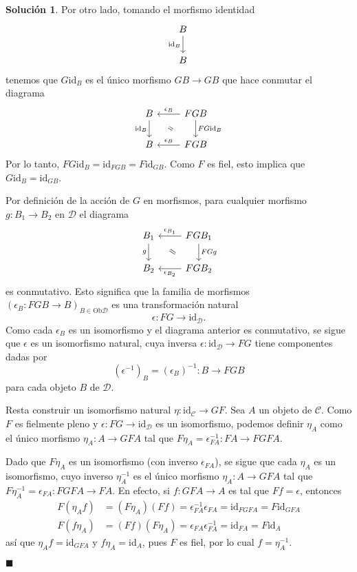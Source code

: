 \documentclass[12pt,letterpaper,titlepage]{article}
\newcommand{\xqed}[1]{%
  \leavevmode\unskip\penalty9999 \hbox{}\nobreak\hfill
  \quad\hbox{\ensuremath{#1}}}
\theoremstyle{definition}
\newtheorem*{soltemp}{Solución}
\newenvironment{sol}[1]{%
    \begin{soltemp}#1}{%
    \xqed{\blacksquare}\end{soltemp}%
}
\renewcommand\cal[1]{\mathcal{#1}}
\newcommand\com[2]{\ar[equal,from={#1},to={#2},shorten=5mm]}
\newcommand\<{\langle}
\renewcommand\>{\rangle}
\newcommand{\Ob}{\mathrm{Ob}}
\newcommand{\id}{\mathrm{id}}
\begin{document}
\begin{sol}
    Por otro lado, tomando el morfismo identidad
    \[
        \begin{tikzcd}
            B \ar[d,"\id_B"'] \\
            B
        \end{tikzcd}
    \]
    tenemos que $G\id_B$ es el único morfismo $GB\to GB$ que hace conmutar
    el diagrama
    \[
        \begin{tikzcd}
            B \ar[d,"\id_B"'] & FGB \ar[l,"\epsilon_B"'] \ar[d,"FG\id_B"] \\
            B & FGB \ar[l,"\epsilon_B"']
            \com{1-1}{2-2}
        \end{tikzcd}
    \]
    Por lo tanto, $FG\id_B=\id_{FGB}=F\id_{GB}$.
    Como $F$ es fiel, esto implica que $G\id_B =\id_{GB}$.
    
    Por definición de la acción de $G$ en morfismos, para cualquier morfismo
    $g:B_1\to B_2$ en $\cal D$ el diagrama
    \[
        \begin{tikzcd}
            B_1 \ar[d,"g"']
            & FGB_1 \ar[l,"\epsilon_{B_1}"'] \ar[d,"FGg"] \\
            B_2 & FGB_2 \ar[l,"\epsilon_{B_2}"]
            \com{1-1}{2-2}
        \end{tikzcd}
    \]
    es conmutativo.
    Esto significa que la familia de morfismos $(\epsilon_B:FGB\to B)_{B\in\Ob\cal D}$
    es una transformación natural
    \[
        \epsilon : FG\to \id_{\cal D}
    .\]
    Como cada $\epsilon_B$ es un isomorfismo y el diagrama anterior
    es conmutativo, se sigue que $\epsilon$ es un
    isomorfismo natural, cuya inversa
    $\epsilon:\id_{\cal D}\to FG$ tiene componentes dadas por
    \[
        (\epsilon^{-1})_B = (\epsilon_B)^{-1}:B\to FGB
    \]
    para cada objeto $B$ de $\cal D$.
    
    Resta construir un isomorfismo natural $\eta:\id_{\cal C}\to GF$.
    Sea $A$ un objeto de $\cal C$.
    Como $F$ es fielmente pleno y $\epsilon:FG\to\id_{\cal D}$ es un
    isomorfismo, podemos definir $\eta_A$ como el único morfismo
    $\eta_A:A\to GFA$ tal que $F\eta_A=\epsilon_{FA}^{-1}:FA\to FGFA$.
    
    Dado que $F\eta_A$ es un isomorfismo (con inverso $\epsilon_{FA}$),
    se sigue que cada $\eta_A$ es un isomorfismo, cuyo inverso $\eta_A^{-1}$ es el
    único morfismo $\eta_A:A\to GFA$ tal que $F\eta_A^{-1}=\epsilon_{FA}:FGFA\to FA$.
    En efecto, si $f:GFA\to A$ es tal que $Ff=\epsilon$, entonces
    \begin{align*}
        F(\eta_Af)
        &=(F\eta_A)(Ff)=\epsilon_{FA}^{-1}\epsilon_{FA}=\id_{FGFA}=F\id_{GFA} \\
        F(f\eta_A)
        &=(Ff)(F\eta_A)=\epsilon_{FA}\epsilon_{FA}^{-1}=\id_{FA}=F\id_A
    \end{align*}
    así que $\eta_Af=\id_{GFA}$ y $f\eta_A=\id_A$, pues $F$ es fiel,
    por lo cual $f=\eta_A^{-1}$.
    

\end{sol}
\end{document}
